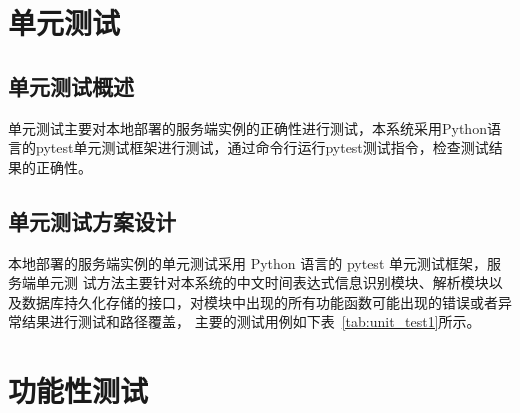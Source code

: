 \section{单元测试}

\subsection{单元测试概述}

单元测试主要对本地部署的服务端实例的正确性进行测试，本系统采用Python语言的pytest单元测试框架进行测试，通过命令行运行pytest测试指令，检查测试结果的正确性。

\subsection{单元测试方案设计}

本地部署的服务端实例的单元测试采用 Python 语言的 pytest 单元测试框架，服务端单元测
试方法主要针对本系统的中文时间表达式信息识别模块、解析模块以及数据库持久化存储的接口，对模块中出现的所有功能函数可能出现的错误或者异常结果进行测试和路径覆盖，
主要的测试用例如下表~\ref{tab:unit_test1}所示。

\section{功能性测试}

